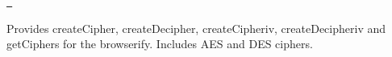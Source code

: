 \href{https://travis-ci.org/crypto-browserify/browserify-cipher}{\texttt{ }}

Provides create\+Cipher, create\+Decipher, create\+Cipheriv, create\+Decipheriv and get\+Ciphers for the browserify. Includes AES and DES ciphers. 